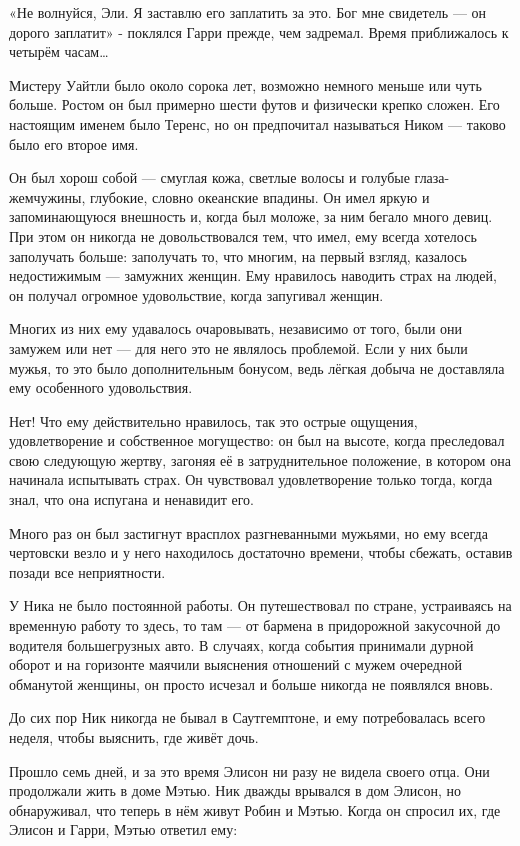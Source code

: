 \documentclass[a5paper, 9pt,
final, openany, twoside=true]{memoir}
\begin{document}
«Не волнуйся, Эли. Я заставлю его заплатить за это. Бог мне свидетель — он дорого заплатит» - поклялся Гарри прежде, чем задремал. Время приближалось к четырём часам…\bigskip

Мистеру Уайтли было около сорока лет, возможно немного меньше или чуть больше. Ростом он был примерно шести футов и физически крепко сложен. Его настоящим именем было Теренс, но он предпочитал называться Ником — таково было его второе имя.

Он был хорош собой — смуглая кожа, светлые волосы и голубые глаза-жемчужины, глубокие, словно океанские впадины. Он имел яркую и запоминающуюся внешность и, когда был моложе, за ним бегало много девиц. При этом он никогда не довольствовался тем, что имел, ему всегда хотелось заполучать больше: заполучать  то, что многим, на первый взгляд, казалось недостижимым — замужних женщин. Ему нравилось наводить страх на людей, он получал огромное удовольствие, когда запугивал женщин.

Многих из них ему удавалось очаровывать, независимо от того, были они замужем или нет — для него это не являлось проблемой. Если у них были мужья, то это было дополнительным бонусом, ведь лёгкая добыча не доставляла ему особенного удовольствия.

Нет! Что ему действительно нравилось, так это острые ощущения, удовлетворение и собственное могущество: он был на высоте, когда преследовал свою следующую жертву, загоняя её в затруднительное положение, в котором она начинала испытывать страх. Он чувствовал удовлетворение только тогда, когда знал, что она испугана и ненавидит его.

Много раз он был застигнут врасплох разгневанными мужьями, но ему всегда чертовски везло и у него находилось достаточно времени, чтобы сбежать, оставив позади все неприятности.

У Ника не было постоянной работы. Он путешествовал по стране, устраиваясь на временную работу то здесь, то там — от бармена в придорожной закусочной до водителя большегрузных авто. В случаях, когда события принимали дурной оборот и на горизонте маячили выяснения отношений с мужем очередной обманутой женщины, он просто исчезал и больше никогда не появлялся вновь.

До сих пор Ник никогда не бывал в Саутгемптоне, и ему потребовалась всего неделя, чтобы выяснить, где живёт дочь.\bigskip

Прошло семь дней, и за это время Элисон ни разу не видела своего отца. Они продолжали жить в доме Мэтью. Ник дважды врывался в дом Элисон, но обнаруживал, что теперь в нём живут Робин и Мэтью. Когда он спросил их, где Элисон и Гарри, Мэтью ответил ему:
\end{document}
